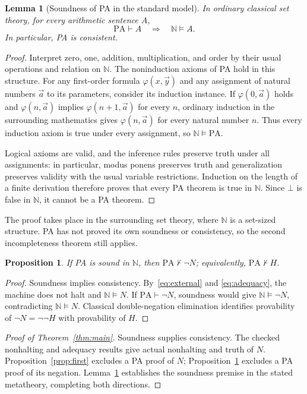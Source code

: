 \documentclass[11pt,letterpaper]{article}
\newtheorem{lemma}[theorem]{Lemma}
\newtheorem{proposition}[theorem]{Proposition}
\newcommand{\PA}{\mathrm{PA}}
\newcommand{\NN}{\mathbb{N}}
\begin{document}
\begin{lemma}[Soundness of PA in the standard model]\label{lem:sound}
In ordinary classical set theory, for every arithmetic sentence $A$,
\[
\PA\vdash A\quad\Longrightarrow\quad\NN\models A.
\]
In particular, PA is consistent.
\end{lemma}
\begin{proof}
Interpret zero, one, addition, multiplication, and order by their usual
operations and relation on $\NN$. The noninduction axioms of PA hold in
this structure. For any first-order formula $\varphi(x,\vec y)$ and any
assignment of natural numbers $\vec a$ to its parameters, consider its
induction instance. If $\varphi(0,\vec a)$ holds and
$\varphi(n,\vec a)$ implies $\varphi(n+1,\vec a)$ for every $n$, ordinary
induction in the surrounding mathematics gives $\varphi(n,\vec a)$ for
every natural number $n$. Thus every induction axiom is true under every
assignment, so $\NN\models\PA$.

Logical axioms are valid, and the inference rules preserve truth under
all assignments: in particular, modus ponens preserves truth and
generalization preserves validity with the usual variable restrictions.
Induction on the length of a finite derivation therefore proves that
every PA theorem is true in $\NN$. Since $\bot$ is false in $\NN$, it
cannot be a PA theorem.
\end{proof}

The proof takes place in the surrounding set theory, where $\NN$ is a
set-sized structure. PA has not proved its own soundness or consistency,
so the second incompleteness theorem still applies.

\begin{proposition}\label{prop:second}
If PA is sound in $\NN$, then $\PA\nvdash\neg N$; equivalently,
$\PA\nvdash H$.
\end{proposition}
\begin{proof}
Soundness implies consistency. By~\eqref{eq:external} and
\eqref{eq:adequacy}, the machine does not halt and $\NN\models N$.
If $\PA\vdash\neg N$, soundness would give $\NN\models\neg N$,
contradicting $\NN\models N$. Classical double-negation elimination
identifies provability of $\neg N=\neg\neg H$ with provability of $H$.
\end{proof}

\begin{proof}[Proof of Theorem~\ref{thm:main}]
Soundness supplies consistency. The checked nonhalting and adequacy
results give actual nonhalting and truth of $N$.
Proposition~\ref{prop:first} excludes a PA proof of $N$;
Proposition~\ref{prop:second} excludes a PA proof of its negation.
Lemma~\ref{lem:sound} establishes the soundness premise in the stated
metatheory, completing both directions.
\end{proof}
\end{document}
